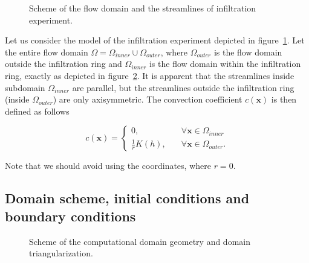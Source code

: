 \documentclass[review]{elsarticle}
\newenvironment{lineq}
    {\begin{linenomath*}
    \begin{equation}
    }
    { 
    \end{equation} 
    \end{linenomath*}
    }
\renewcommand{\vec}{\mathbf}
\begin{document}
 \begin{figure}
\centering
{}
 \caption{Scheme of the flow domain and the streamlines of infiltration experiment. }
 \label{valecproudy}
\end{figure}

Let us consider the model of the infiltration experiment depicted in figure~\ref{valecproudy}. Let the entire flow domain $\Omega=\Omega_{inner} \cup \Omega_{outer}$, where $\Omega_{outer}$ is the flow domain outside the infiltration ring and $\Omega_{inner}$ is the flow domain within the infiltration ring, exactly as depicted in figure~\ref{valec}. It is apparent that the streamlines inside subdomain $\Omega_{inner}$ are parallel, but the streamlines outside the infiltration ring (inside $\Omega_{outer}$) are only axisymmetric. The convection coefficient $c(\vec{x})$ is then defined as follows
\begin{lineq}
\label{convect}
c(\vec{x}) = \begin{cases}
	     0 , \quad &\forall \vec{x} \in \Omega_{inner} \\
	     \frac{1}{r}K(h) , \quad &\forall \vec{x} \in \Omega_{outer}.
	    \end{cases}
\end{lineq}
Note that we should avoid using the coordinates, where $r=0$.


\subsection{Domain scheme, initial conditions and boundary conditions}%
\label{bccond}
 \begin{figure}
\centering
{}
 \caption{Scheme of the computational domain geometry and domain triangularization.}
 \label{valec}
\end{figure}
\end{document}
